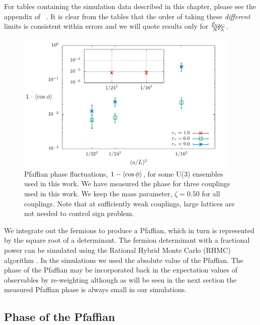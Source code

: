 For tables containing the simulation data described in this chapter, please see the appendix of ~\cite{Catterall:2017xox}. 
It is clear from the tables that the order of taking these \emph{different} limits is consistent within errors and we will quote results only for $\frac{\mathcal{E}_{\mathrm{VAC}}}{N^2 \lambda}$.
\begin{figure}[htb]
\begin{center} 
\includegraphics[width=0.95\textwidth]{Figures/2dq4_sign.pdf}
\end{center}
\caption{\label{fig:pfaffian1}Pfaffian phase fluctuations, $1 - \left\langle \cos\phi \right\rangle$, for some U(3) ensembles used in this work. We have measured the phase for three couplings used in this work. We keep the mass parameter, $\zeta = 0.50$ for all couplings. Note that at sufficiently weak couplings, large lattices are not needed to control sign problem.}
\end{figure}
We integrate out the fermions to produce a Pfaffian, which in turn is represented by the square root of a determinant. The fermion determinant with a fractional power can be simulated using the Rational Hybrid Monte Carlo (RHMC) algorithm \cite{Clark:2004cp}. In the simulations we used the absolute value of the Pfaffian. The phase of the Pfaffian may be incorporated back in the expectation values of observables by re-weighting although as will be seen in the next section the measured Pfaffian phase is always small in our simulations.

\subsection{Phase of the Pfaffian}
\label{sec:pfaf} 

